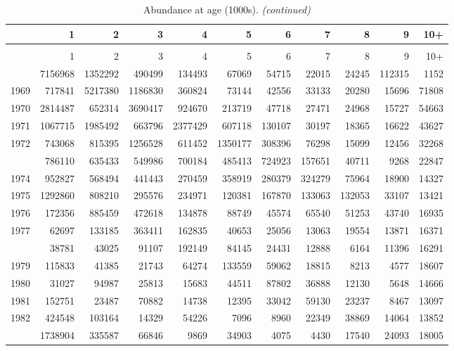 \documentclass[
]{article}
\begin{document}
\begin{longtable}[t]{lrrrrrrrrrr}
\caption{\label{tab:NAA-table}Abundance at age (1000s).}\\
\toprule
  & 1 & 2 & 3 & 4 & 5 & 6 & 7 & 8 & 9 & 10+\\
\midrule
\endfirsthead
\caption[]{Abundance at age (1000s). \textit{(continued)}}\\
\toprule
  & 1 & 2 & 3 & 4 & 5 & 6 & 7 & 8 & 9 & 10+\\
\midrule
\endhead

\endfoot
\bottomrule
\endlastfoot
1968 & 7156968 & 1352292 & 490499 & 134493 & 67069 & 54715 & 22015 & 24245 & 112315 & 1152\\
1969 & 717841 & 5217380 & 1186830 & 360824 & 73144 & 42556 & 33133 & 20280 & 15696 & 71808\\
1970 & 2814487 & 652314 & 3690417 & 924670 & 213719 & 47718 & 27471 & 24968 & 15727 & 54663\\
1971 & 1067715 & 1985492 & 663796 & 2377429 & 607118 & 130107 & 30197 & 18365 & 16622 & 43627\\
1972 & 743068 & 815395 & 1256528 & 611452 & 1350177 & 308396 & 76298 & 15099 & 12456 & 32268\\
\addlinespace
1973 & 786110 & 635433 & 549986 & 700184 & 485413 & 724923 & 157651 & 40711 & 9268 & 22847\\
1974 & 952827 & 568494 & 441443 & 270459 & 358919 & 280379 & 324279 & 75964 & 18900 & 14327\\
1975 & 1292860 & 808210 & 295576 & 234971 & 120381 & 167870 & 133063 & 132053 & 33107 & 13421\\
1976 & 172356 & 885459 & 472618 & 134878 & 88749 & 45574 & 65540 & 51253 & 43740 & 16935\\
1977 & 62697 & 133185 & 363411 & 162835 & 40653 & 25056 & 13063 & 19554 & 13871 & 16371\\
\addlinespace
1978 & 38781 & 43025 & 91107 & 192149 & 84145 & 24431 & 12888 & 6164 & 11396 & 16291\\
1979 & 115833 & 41385 & 21743 & 64274 & 133559 & 59062 & 18815 & 8213 & 4577 & 18607\\
1980 & 31027 & 94987 & 25813 & 15683 & 44511 & 87802 & 36888 & 12130 & 5648 & 14666\\
1981 & 152751 & 23487 & 70882 & 14738 & 12395 & 33042 & 59130 & 23237 & 8467 & 13097\\
1982 & 424548 & 103164 & 14329 & 54226 & 7096 & 8960 & 22349 & 38869 & 14064 & 13852\\
\addlinespace
1983 & 1738904 & 335587 & 66846 & 9869 & 34903 & 4075 & 4430 & 17540 & 24093 & 18005\\

\end{longtable}
\end{document}

